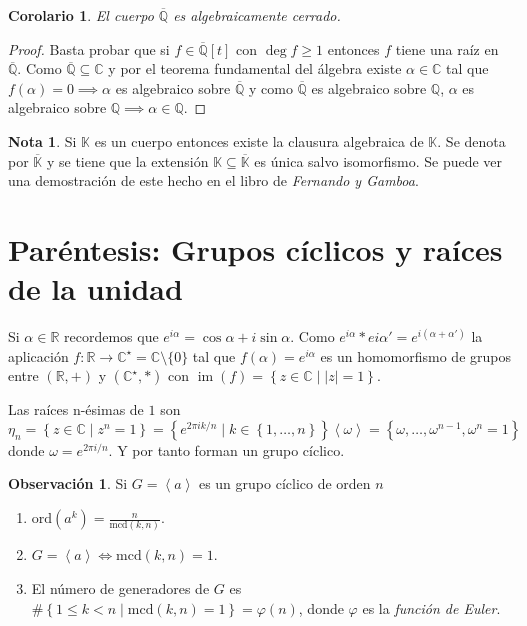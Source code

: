 \documentclass[10pt, spanish]{report}
\newtheorem*{cor}{Corolario}
\theoremstyle{definition}
\newtheorem*{obs}{Observación}
\newtheorem*{nota}{Nota}
\newcommand{\Q}{\mathbb{Q}}
\newcommand{\R}{\mathbb{R}}
\newcommand{\C}{\mathbb{C}}
\newcommand{\K}{\mathbb{K}}
\newcommand{\im}[1]{\operatorname{im}\left(#1\right)}
\renewcommand{\geq}{\geqslant}
\renewcommand{\leq}{\leqslant}
\begin{document}
\begin{cor}
    El cuerpo $\overline{\Q}$ es algebraicamente cerrado.
\end{cor}

\begin{proof}
    Basta probar que si $f\in\overline{\Q}[t]$ con $\deg{f}\geq1$ entonces $f$
    tiene una raíz en $\overline{\Q}$. Como $\overline{\Q}\subseteq\C$ y por el
    teorema fundamental del álgebra existe $\alpha\in\C$ tal que $f(\alpha)=0
    \implies\alpha$ es algebraico sobre $\overline{\Q}$ y como $\overline{\Q}$
    es algebraico sobre $\Q$, $\alpha$ es algebraico sobre $\Q \implies
    \alpha\in\Q$.
\end{proof}

\begin{nota}
    Si $\K$ es un cuerpo entonces existe la clausura algebraica de $\K$. Se
    denota por $\overline{\K}$ y se tiene que la extensión $\K\subseteq
    \overline{\K}$ es única salvo isomorfismo. Se puede ver una demostración de
    este hecho en el libro de \textit{Fernando y Gamboa}.
\end{nota}

\section{Paréntesis: Grupos cíclicos y raíces de la unidad}

Si $\alpha\in\R$ recordemos que $e^{i\alpha}=\cos{\alpha}+i\sin{\alpha}$. Como
$e^{i\alpha}*e{i\alpha'}=e^{i(\alpha+\alpha')}$ la aplicación
$f:\R\to\C^\star=\C\setminus\{0\}$ tal que $f(\alpha)=e^{i\alpha}$ es un
homomorfismo de grupos entre $(\R,+)$ y $(\C^\star,*)$ con $\im{f}=\left\{ z\in
\C\mid \left| z \right| = 1 \right\}$.

Las raíces n-ésimas de $1$ son \[\eta_n=\left\{ z\in \C\mid z^n=1 \right\} =
\left\{ e^{2\pi ik/n}\mid k\in\left\{1,\ldots,n\right\}\right\}\left< \omega
\right> = \left\{ \omega,\ldots,\omega^{n-1},\omega^n=1 \right\}\]
donde $\omega = e^{2\pi i /n}$. Y por tanto forman un grupo cíclico.

\begin{obs}
    Si $G= \left< a \right>$ es un grupo cíclico de orden $n$
    \begin{enumerate}
        \item $\text{ord}(a^k)=\frac{n}{\text{mcd}(k,n)}$.
        \item $G= \left< a \right> \Leftrightarrow \text{mcd}(k,n)=1$.
        \item El número de generadores de $G$ es $\#\left\{ 1\leq k<
            n\mid\text{mcd}(k,n)=1 \right\}=\varphi(n)$, donde $\varphi$ es la
            \textit{función de Euler}.
    \end{enumerate}
\end{obs}
\end{document}

